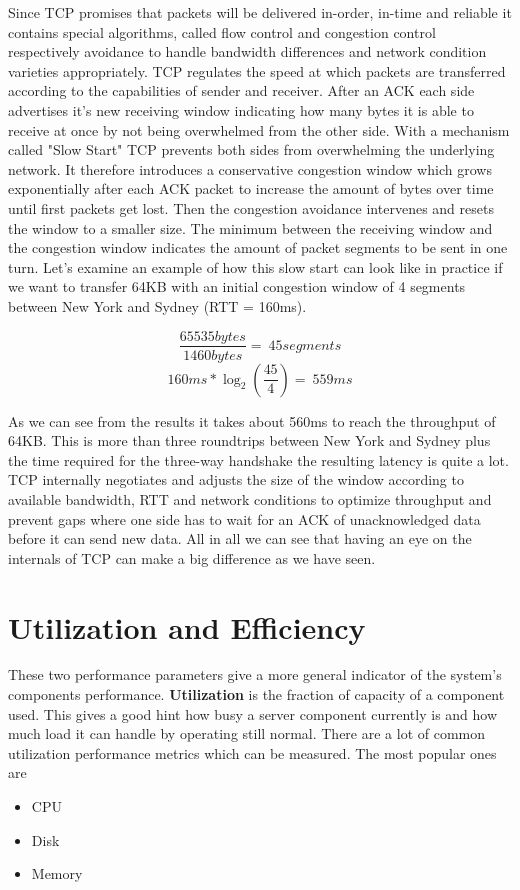 Since TCP promises that packets will be delivered in-order, in-time and reliable it contains special algorithms, called flow control and congestion control respectively avoidance to handle bandwidth differences and network condition varieties appropriately. TCP regulates the speed at which packets are transferred according to the capabilities of sender and receiver. After an ACK each side advertises it's new receiving window indicating how many bytes it is able to receive at once by not being overwhelmed from the other side. With a mechanism called "Slow Start" TCP prevents both sides from overwhelming the underlying network. It therefore introduces a conservative congestion window which grows exponentially after each ACK packet to increase the amount of bytes over time until first packets get lost. Then the congestion avoidance intervenes and resets the window to a smaller size. The minimum between the receiving window and the congestion window indicates the amount of packet segments to be sent in one turn. 
Let's examine an example of how this slow start can look like in practice if we want to transfer 64KB with an initial congestion window of 4 segments between New York and Sydney (RTT = 160ms).

$$\frac{65535 bytes}{1460 bytes} = ~45 segments$$
$$160ms * \log_2 (\frac{45}{4}) = ~559ms$$

As we can see from the results it takes about 560ms to reach the throughput of 64KB. This is more than three roundtrips between New York and Sydney plus the time required for the three-way handshake the resulting latency is quite a lot. TCP internally negotiates and adjusts the size of the window according to available bandwidth, RTT and network conditions to optimize throughput and prevent gaps where one side has to wait for an ACK of unacknowledged data before it can send new data. All in all we can see that having an eye on the internals of TCP can make a big difference as we have seen. \cite{Grigorik_2013} 

\section{Utilization and Efficiency}
These two performance parameters give a more general indicator of the system's components performance. \textbf{Utilization} is the fraction of capacity of a component used. \cite{Killelea_2002} This gives a good hint how busy a server component currently is and how much load it can handle by operating still normal. There are a lot of common utilization performance metrics which can be measured. The most popular ones are
\begin{itemize}
	\item{CPU}
	\item{Disk}
	\item{Memory}
\end{itemize} 

